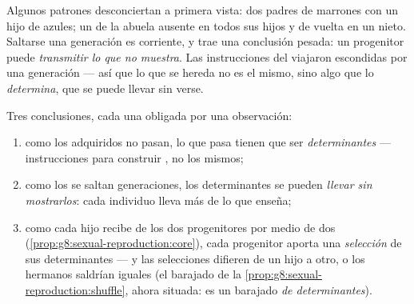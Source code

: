 \begin{example}\label{ex:g9:heredity-and-traits:skip}
Algunos patrones desconciertan a primera vista: dos padres de 
marrones con un hijo de  azules; un  de la abuela ausente en
todos sus hijos y de vuelta en un nieto. Saltarse una generación es
corriente, y trae una conclusión pesada: un progenitor puede
\emph{transmitir lo que no muestra}. Las instrucciones del 
viajaron escondidas por una generación --- así que lo que se hereda no
es el  mismo, sino algo que lo \emph{determina}, que se puede
llevar sin verse.
\end{example}

\begin{proposition}\label{prop:g9:heredity-and-traits:conclusions}
Tres conclusiones, cada una obligada por una observación:
\begin{enumerate}
  \item como los  adquiridos no pasan, lo que pasa tienen que ser
        \emph{determinantes} --- instrucciones para construir ,
        no los  mismos;
  \item como los  se saltan generaciones, los determinantes se
        pueden \emph{llevar sin mostrarlos}: cada individuo lleva más
        de lo que enseña;
  \item como cada hijo recibe de los dos progenitores por medio de dos
         (\cref{prop:g8:sexual-reproduction:core}), cada
        progenitor aporta una \emph{selección} de sus determinantes ---
        y las selecciones difieren de un hijo a otro, o los hermanos
        saldrían iguales (el barajado de la
        \cref{prop:g8:sexual-reproduction:shuffle}, ahora situada: es
        un barajado \emph{de determinantes}).
\end{enumerate}
\end{proposition}
\admitted

